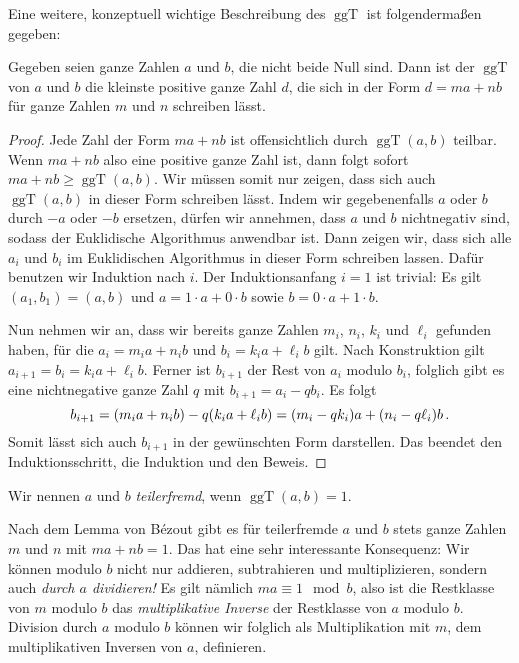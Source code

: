 Eine weitere, konzeptuell wichtige Beschreibung des $\operatorname{ggT}$ ist folgendermaßen gegeben:
\begin{satzmitnamen}
	Gegeben seien ganze Zahlen $a$ und $b$, die nicht beide Null sind. Dann ist der $\operatorname{ggT}$ von $a$ und $b$ die kleinste positive ganze Zahl $d$, die sich in der Form $d=ma+n b$ für ganze Zahlen $m$ und $n$ schreiben lässt.
\end{satzmitnamen}
\begin{proof}
	Jede Zahl der Form $ma+nb$ ist offensichtlich durch $\operatorname{ggT}(a,b)$ teilbar. Wenn $ma+nb$ also eine positive ganze Zahl ist, dann folgt sofort $ma+nb\geqslant \operatorname{ggT}(a,b)$. Wir müssen somit nur zeigen, dass sich auch $\operatorname{ggT}(a,b)$ in dieser Form schreiben lässt. Indem wir gegebenenfalls $a$ oder $b$ durch $-a$ oder $-b$ ersetzen, dürfen wir annehmen, dass $a$ und $b$ nichtnegativ sind, sodass der Euklidische Algorithmus anwendbar ist. Dann zeigen wir, dass sich alle $a_i$ und $b_i$ im Euklidischen Algorithmus in dieser Form schreiben lassen. Dafür benutzen wir Induktion nach $i$. Der Induktionsanfang $i=1$ ist trivial: Es gilt $(a_1,b_1)=(a,b)$ und $a=1\cdot a+0\cdot b$ sowie $b=0\cdot a+1\cdot b$.
	
	Nun nehmen wir an, dass wir bereits ganze Zahlen $m_i$, $n_i$, $k_i$ und $\ell_i$ gefunden haben, für die $a_i=m_i a+n_i b$ und $b_i=k_ia+\ell_ib$ gilt. Nach Konstruktion gilt $a_{i+1}=b_i=k_ia+\ell_ib$. Ferner ist $b_{i+1}$ der Rest von $a_i$ modulo $b_i$, folglich gibt es eine nichtnegative ganze Zahl $q$ mit $b_{i+1}=a_i-qb_i$. Es folgt
	\begin{equation*}
		b_{i+1}=\parens*{m_ia+n_ib}-q\parens*{k_i a+\ell_i b}=\parens*{m_i-qk_i}a+\parens*{n_i-q\ell_i}b\,.
	\end{equation*}
	Somit lässt sich auch $b_{i+1}$ in der gewünschten Form darstellen. Das beendet den Induktionsschritt, die Induktion und den Beweis.
\end{proof}

\begin{definition}
	Wir nennen $a$ und $b$ \emph{teilerfremd}, wenn $\operatorname{ggT}(a,b)=1$.
\end{definition}
Nach dem Lemma von Bézout gibt es für teilerfremde $a$ und $b$ stets ganze Zahlen $m$ und $n$ mit $ma+nb=1$. Das hat eine sehr interessante Konsequenz: Wir können modulo $b$ nicht nur addieren, subtrahieren und multiplizieren, sondern auch \emph{durch $a$ dividieren!} Es gilt nämlich $ma\equiv 1\mod b$, also ist die Restklasse von $m$ modulo $b$ das \emph{multiplikative Inverse} der Restklasse von $a$ modulo $b$. Division durch $a$ modulo $b$ können wir folglich als Multiplikation mit $m$, dem multiplikativen Inversen von $a$, definieren.

